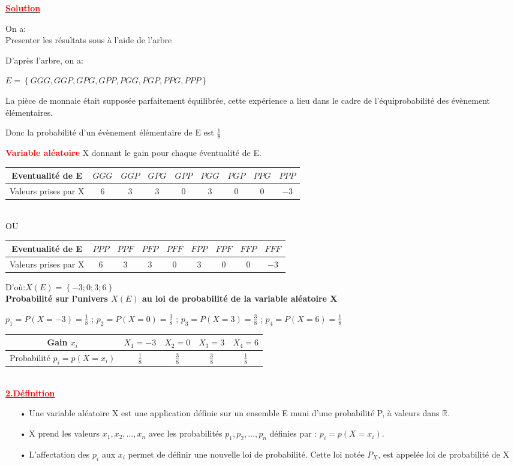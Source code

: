 \documentclass[12pt]{article}
\begin{document}
\underline{\textbf{\textcolor{red}{Solution}}}

On a:\\
Presenter les résultats sous à l'aide de l'arbre

D'après l'arbre, on a:

$E=\left\lbrace GGG, GGP, GPG, GPP, PGG, PGP, PPG, PPP \right\rbrace $

La pièce de monnaie était supposée parfaitement équilibrée, cette expérience a lieu dans le cadre de l'équiprobabilité des évènement élémentaires. 

Donc la probabilité d'un évènement élémentaire de E est $\frac{1}{8}$

\textbf{\textcolor{red}{Variable aléatoire}} X donnant le gain pour chaque éventualité de E.

\begin{tabular}{|c|c|c|c|c|c|c|c|c|}
\hline
Eventualité de E & $GGG$ & $GGP$ & $GPG$&$GPP$&$PGG$&$PGP$&$PPG$&$PPP$\\
\hline
Valeurs prises par X &$6$ &$3$&$3$&$0$&$3$&$0$&$0$&$-3$ \\
\hline
\end{tabular}\\
OU\\
\begin{tabular}{|c|c|c|c|c|c|c|c|c|}
\hline
Eventualité de E & $PPP$ & $PPF$ & $PFP$&$PFF$&$FPP$&$FPF$&$FFP$&$FFF$\\
\hline
Valeurs prises par X &$6$ &$3$&$3$&$0$&$3$&$0$&$0$&$-3$ \\
\hline
\end{tabular}

D'où:$X(E) = \left\lbrace -3 ;0 ;3 ;6 \right\rbrace $\\

\textbf{Probabilité sur l'univers $X(E)$ au loi de probabilité de la variable aléatoire X}

$p_{1}=P(X=-3)=\frac{1}{8}$ ; $p_{2}=P(X=0)=\frac{3}{8}$ ; $p_{3}=P(X=3)=\frac{3}{8}$ ; $p_{4}=P(X=6)=\frac{1}{8}$

\begin{tabular}{|c|c|c|c|c|}
\hline
Gain $x_{i}$ & $X_{1}=-3$ & $X_{2}=0$ & $X_{3}=3$&$X_{4}=6$\\
\hline
Probabilité $p_{i} = p(X = x_{i}) $ &$\frac{1}{8}$ &$\frac{3}{8}$&$\frac{3}{8}$&$\frac{1}{8}$ \\
\hline
\end{tabular}
\\
\underline{\textbf{\textcolor{red}{2.Définition}}}
\begin{itemize}
\item[•] Une variable aléatoire X est une application définie sur un ensemble E muni d’une
probabilité P, à valeurs dans $\mathbb{R}$.
\item[•] X prend les valeurs $x_{1}, x_{2}, …, x_{n}$ avec les probabilités $p_{1}, p_{2}, …, p_{n}$ définies par : $p_{i} = p(X = x_{i})$.
\item[•] L’affectation des $p_{i}$ aux $x_{i}$ permet de définir une nouvelle loi de probabilité. Cette loi notée $P_{X}$, est appelée
loi de probabilité de X
\end{itemize} 
\end{document}

